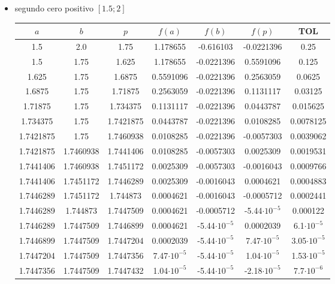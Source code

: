 \documentclass[12pt]{article}
\begin{document}
\begin{enumerate}
\begin{enumerate}
\begin{itemize}
            \item segundo cero positivo \([1.5; 2]\)
            
            \begin{center}
            \begin{tabular}{|c|c|c|c|c|c|c|}
            \hline
            \(a\) & \(b\)& \(p\)&\(f(a)\) & \(f(b)\) & \(f(p)\)&\textbf{TOL} \\
            \hline
            1.5 & 2.0 & 1.75 & 1.178655 & -0.616103 & -0.0221396 & 0.25 \\
            1.5 & 1.75 & 1.625 & 1.178655 & -0.0221396 & 0.5591096 & 0.125 \\
            1.625 & 1.75 & 1.6875 & 0.5591096 & -0.0221396 & 0.2563059 & 0.0625 \\
            1.6875 & 1.75 & 1.71875 & 0.2563059 & -0.0221396 & 0.1131117 & 0.03125 \\
            1.71875 & 1.75 & 1.734375 & 0.1131117 & -0.0221396 & 0.0443787 & 0.015625 \\
            1.734375 & 1.75 & 1.7421875 & 0.0443787 & -0.0221396 & 0.0108285 & 0.0078125 \\
            1.7421875 & 1.75 & 1.7460938 & 0.0108285 & -0.0221396 & -0.0057303 & 0.0039062 \\
            1.7421875 & 1.7460938 & 1.7441406 & 0.0108285 & -0.0057303 & 0.0025309 & 0.0019531 \\
            1.7441406 & 1.7460938 & 1.7451172 & 0.0025309 & -0.0057303 & -0.0016043 & 0.0009766 \\
            1.7441406 & 1.7451172 & 1.7446289 & 0.0025309 & -0.0016043 & 0.0004621 & 0.0004883 \\
            1.7446289 & 1.7451172 & 1.744873 & 0.0004621 & -0.0016043 & -0.0005712 & 0.0002441 \\
            1.7446289 & 1.744873 & 1.7447509 & 0.0004621 & -0.0005712 & -5.44\(\cdot 10^{-5}\) & 0.000122 \\
            1.7446289 & 1.7447509 & 1.7446899 & 0.0004621 & -5.44\(\cdot 10^{-5}\) & 0.0002039 & 6.1\(\cdot 10^{-5}\) \\
            1.7446899 & 1.7447509 & 1.7447204 & 0.0002039 & -5.44\(\cdot 10^{-5}\) & 7.47\(\cdot 10^{-5}\) & 3.05\(\cdot 10^{-5}\) \\
            1.7447204 & 1.7447509 & 1.7447356 & 7.47\(\cdot 10^{-5}\) & -5.44\(\cdot 10^{-5}\) & 1.04\(\cdot 10^{-5}\) & 1.53\(\cdot 10^{-5}\) \\
            1.7447356 & 1.7447509 & 1.7447432 & 1.04\(\cdot 10^{-5}\) & -5.44\(\cdot 10^{-5}\) & -2.18\(\cdot 10^{-5}\) & 7.7\(\cdot 10^{-6}\) \\

\end{tabular}
\end{center}
\end{itemize}
\end{enumerate}
\end{enumerate}
\end{document}
